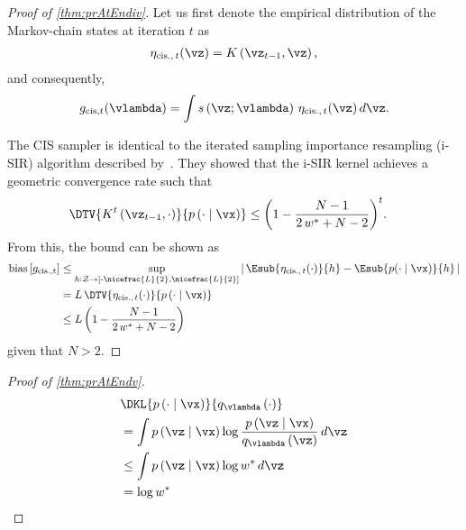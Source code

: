 \label{proofsection:prAtEndiv}\begin{proof}[Proof of \autoref{thm:prAtEndiv}]\label{proof:prAtEndiv}Let us first denote the empirical distribution of the Markov-chain states at iteration \(t\) as \begin {align} \eta _{\mathrm {cis.},\, t}(\vz ) = K\left (\vz _{t-1}, \vz \right ), \end {align} and consequently, \begin {align} g_{\mathrm {cis}, t}(\vlambda ) = \int s\left (\vz ; \vlambda \right ) \, \eta _{\mathrm {cis.},\, t}(\vz ) \, d\vz . \end {align} \par The CIS sampler is identical to the iterated sampling importance resampling (i-SIR) algorithm described by~\citet {andrieu_uniform_2018}. They showed that the i-SIR kernel achieves a geometric convergence rate such that \begin {align} \DTV {K^{t}\left (\vz _{t-1},\cdot \right )}{p\left (\cdot \mid \vx \right )} &\leq {\left (1 - \frac {N - 1}{2\,w^* + N - 2}\right )}^t. \end {align} From this, the bound can be shown as \begin {align} \mathrm {bias}\left [ g_{\mathrm {cis., t}} \right ] &\leq \sup _{h : \mathcal {Z} \rightarrow \left [ \text {-}\nicefrac {L}{2}, \nicefrac {L}{2} \right ]} \left |\, \Esub {\eta _{\mathrm {cis.},\, t}(\cdot )}{h} - \Esub {p(\cdot \mid \vx )}{h} \,\right | \\ &= L \, \DTV { \eta _{\mathrm {cis.},\, t}(\cdot ) }{p\left (\cdot \mid \vx \right )} \\ &\leq L \, {\left (1 - \frac {N - 1}{2\,w^* + N - 2}\right )} \end {align} given that \(N > 2\).\end{proof}
\prAtEndRestatev*
\label{proofsection:prAtEndv}\begin{proof}[Proof of \autoref{thm:prAtEndv}]\label{proof:prAtEndv}\begin {align*} &\DKL {p\left (\cdot \mid \vx \right )}{ q_{\vlambda }\left (\cdot \right ) } \\ &= \int p\left (\vz \mid \vx \right ) \log \frac {p\left (\vz \mid \vx \right )}{q_{\vlambda }\left (\vz \right )}\,d\vz \\ &\leq \int p\left (\vz \mid \vx \right ) \log w^* \, d\vz \\ &= \log w^* \end {align*}\end{proof}
